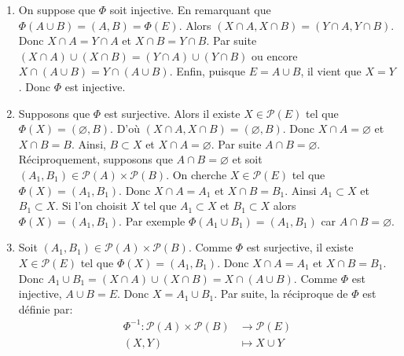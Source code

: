 	\begin{enumerate}
		\item On suppose que $\Phi$ soit injective. En remarquant que $\Phi(A \cup B) =(A,B)=\Phi(E)$. Alors $(X\cap A, X \cap B) = (Y \cap A, Y \cap B).$ Donc $X \cap A = Y \cap A$ et $X \cap B = Y \cap B$. Par suite $(X \cap A) \cup (X \cap B) = (Y \cap A) \cup (Y \cap B)$ ou encore $X\cap (A \cup B) = Y \cap(A \cup B)$. Enfin, puisque $E=A \cup B$, il  vient que $X=Y$. Donc $\Phi$ est injective.
		\item Supposons que $\Phi$ est surjective. Alors il existe $X \in \mathcal{P}(E)$ tel que $\Phi(X)=(\varnothing, B)$. D'où $(X \cap A, X \cap B)=(\varnothing, B)$. Donc $X \cap A = \varnothing$ et $X\cap B = B$. Ainsi, $B \subset X$ et $X \cap A = \varnothing$. Par suite $A\cap B = \varnothing$. Réciproquement, supposons que $A\cap B=\varnothing$ et soit $(A_1, B_1)\in \mathcal{P}(A)\times \mathcal{P}(B)$. On cherche $X\in \mathcal{P}(E)$ tel que $\Phi (X)=(A_1,B_1)$. Donc $X\cap A =A_1$ et $X\cap B = B_1$. Ainsi $A_1 \subset X$ et $B_1 \subset X$. Si l'on choisit $X$ tel que $A_1 \subset X$  et $B_1 \subset X$ alors $\Phi (X)=(A_1,B_1)$. Par exemple $\Phi (A_1\cup B_1)=(A_1,B_1)$ car $A\cap B=\varnothing$.
		\item Soit $(A_1, B_1)\in \mathcal{P}(A)\times \mathcal{P}(B)$. Comme $\Phi$ est surjective, il existe $X\in \mathcal{P}(E)$ tel que $\Phi (X)=(A_1,B_1)$. Donc $X\cap A =A_1$ et $X\cap B = B_1$. Donc $A_1 \cup B_1 =(X\cap A)\cup (X\cap B) = X\cap (A\cup B)$. Comme $\Phi$ est injective, $A\cup B=E$. Donc $X=A_1\cup B_1$. Par suite, la réciproque de $\Phi$ est définie par:
		\begin{align*}
			\Phi^{-1}: \mathcal{P}(A)\times \mathcal{P}(B) &\longrightarrow \mathcal{P}(E)\\
			(X,Y) &\longmapsto X\cup Y
		\end{align*}
	\end{enumerate}
